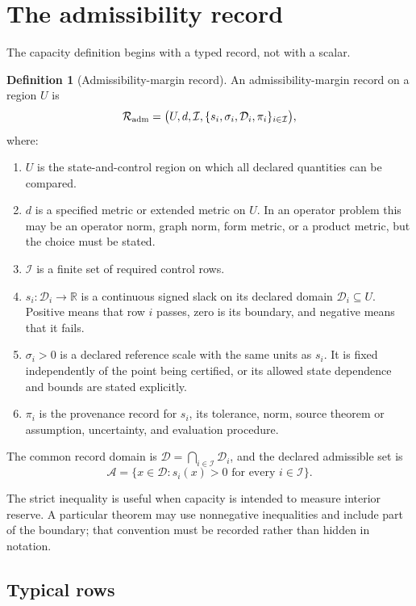 \documentclass[11pt]{article}
\theoremstyle{definition}
\newtheorem{definition}[theorem]{Definition}
\theoremstyle{remark}
\newcommand{\cA}{\mathcal A}
\newcommand{\cD}{\mathcal D}
\newcommand{\cI}{\mathcal I}
\newcommand{\cR}{\mathcal R}
\begin{document}
\section{The admissibility record}
\label{sec:record}

The capacity definition begins with a typed record, not with a scalar.

\begin{definition}[Admissibility-margin record]
\label{def:record}
An admissibility-margin record on a region \(U\) is
\[
 \cR_{\rm adm}
 =
 \bigl(
 U,d,\cI,\{s_i,\sigma_i,\cD_i,\pi_i\}_{i\in\cI}
 \bigr),
\]
where:
\begin{enumerate}[leftmargin=2.2em]
\item \(U\) is the state-and-control region on which all declared
      quantities can be compared.
\item \(d\) is a specified metric or extended metric on \(U\).  In an
      operator problem this may be an operator norm, graph norm, form
      metric, or a product metric, but the choice must be stated.
\item \(\cI\) is a finite set of required control rows.
\item \(s_i:\cD_i\to\mathbb R\) is a continuous signed slack on its declared
      domain \(\cD_i\subseteq U\).  Positive means that row \(i\) passes,
      zero is its boundary, and negative means that it fails.
\item \(\sigma_i>0\) is a declared reference scale with the same units as
      \(s_i\).  It is fixed independently of the point being certified, or
      its allowed state dependence and bounds are stated explicitly.
\item \(\pi_i\) is the provenance record for \(s_i\), its tolerance, norm,
      source theorem or assumption, uncertainty, and evaluation procedure.
\end{enumerate}
The common record domain is
\(\cD=\bigcap_{i\in\cI}\cD_i\), and the declared admissible set is
\[
 \cA
 =
 \{x\in\cD:s_i(x)>0\text{ for every }i\in\cI\}.
\]
\end{definition}

The strict inequality is useful when capacity is intended to measure
interior reserve.  A particular theorem may use nonnegative inequalities
and include part of the boundary; that convention must be recorded rather
than hidden in notation.

\subsection{Typical rows}
\end{document}
